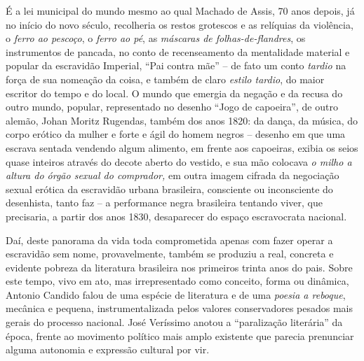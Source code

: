 É a lei municipal do mundo mesmo ao qual Machado de Assis, 70 anos
depois, já no início do novo século, recolheria os restos grotescos e as
relíquias da violência, o \emph{ferro ao pescoço}, o \emph{ferro ao pé},
as \emph{máscaras de folhas-de-flandres}, os instrumentos de pancada, no
conto de recenseamento da mentalidade material e popular da escravidão
Imperial, ``Pai contra mãe'' -- de fato um conto \emph{tardio} na força
de sua nomeação da coisa, e também de claro \emph{estilo tardio}, do
maior escritor do tempo e do local. O mundo que emergia da negação e da
recusa do outro mundo, popular, representado no desenho ``Jogo de
capoeira'', de outro alemão, Johan Moritz Rugendas, também dos anos
1820: da dança, da música, do corpo erótico da mulher e forte e ágil do
homem negros -- desenho em que uma escrava sentada vendendo algum
alimento, em frente aos capoeiras, exibia os seios quase inteiros
através do decote aberto do vestido, e sua mão colocava \emph{o milho a
altura do órgão sexual do comprador,} em outra imagem cifrada da
negociação sexual erótica da escravidão urbana brasileira, consciente ou
inconsciente do desenhista, tanto faz -- a performance negra brasileira
tentando viver, que precisaria, a partir dos anos 1830, desaparecer do
espaço escravocrata nacional.

Daí, deste panorama da vida toda comprometida apenas com fazer operar a
escravidão sem nome, provavelmente, também se produziu a real, concreta
e evidente pobreza da literatura brasileira nos primeiros trinta anos do
pais. Sobre este tempo, vivo em ato, mas irrepresentado como conceito,
forma ou dinâmica, Antonio Candido falou de uma espécie de literatura e
de uma \emph{poesia a reboque}, mecânica e pequena, instrumentalizada
pelos valores conservadores pesados mais gerais do processo nacional.
José Veríssimo anotou a ``paralização literária'' da época, frente ao
movimento político mais amplo existente que parecia prenunciar alguma
autonomia e expressão cultural por vir.

